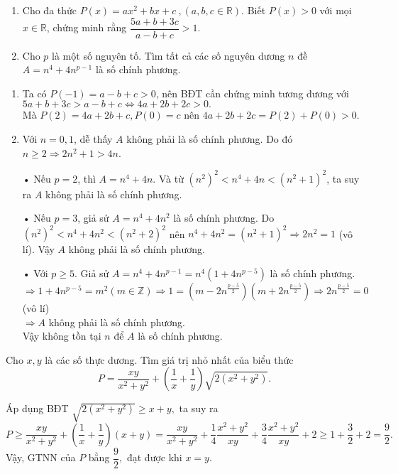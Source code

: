 \begin{ex}%
\hfill
    \begin{enumerate}    
        \item Cho đa thức $P(x)=ax^2+bx+c\ ,(a,b,c \in \mathbb{R})$. Biết $P(x)>0$ với mọi $x \in \mathbb{R}$, chứng minh rằng $\dfrac{5a+b+3c}{a-b+c}>1$.
        \item Cho $p$ là một số nguyên tố. Tìm tất cả các số nguyên dương $n$ đề $A=n^4+4n^{p-1}$ là số chính phương.
    \end{enumerate}
\loigiai
    {
    \begin{enumerate}
    
        \item Ta có $P(-1)=a-b+c>0$, nên BĐT cần chứng minh tương đương với $5a+b+3c>a-b+c \Leftrightarrow 4a+2b+2c>0.$\\
        Mà $P(2)=4a+2b+c, P(0)=c$ nên $4a+2b+2c=P(2)+P(0)>0.$
        \item Với $n=0,1$, dễ thấy $A$ không phải là số chính phương. Do đó $n \ge 2 \Rightarrow 2n^2+1 > 4n$.
        \item[•] Nếu $p=2$, thì $A=n^4+4n$. Và từ $(n^2)^2 < n^4+4n < (n^2+1)^2$, ta suy ra $A$ không phải là số chính phương.
        \item[•] Nếu $p=3$, giả sử $A=n^4+4n^2$ là số chính phương. Do $(n^2)^2 < n^4+4n^2 < (n^2+2)^2$ nên $n^4+4n^2=(n^2+1)^2\Rightarrow 2n^2=1$ (vô lí). Vậy $A$ không phải là số chính phương.
        \item[•] Với $p \geq 5$. Giả sử $A=n^4+4n^{p-1}=n^4(1+4n^{p-5})$ là số chính phương.\\
        $\Rightarrow 1+4n^{p-5}=m^2(m \in \mathbb{Z})\Rightarrow 1=\left( m-2n^{\frac{p-5}{2}} \right) \left(m+2n^{\frac{p-5}{2}}\right)  \Rightarrow 2n^{\frac{p-5}{2}}=0$ (vô lí)\\ $\Rightarrow A$ không phải là số chính phương.\\
        Vậy không tồn tại $n$ để $A$ là số chính phương.
        
        
    \end{enumerate}
    }
\end{ex}

\begin{ex}%
    Cho $x,y$ là các số thực dương. Tìm giá trị nhỏ nhất của biểu thức
$$P=\dfrac{xy}{x^2+y^2}+\left(\dfrac{1}{x}+\dfrac{1}{y}\right)\sqrt{2(x^2+y^2)}.$$
    
\loigiai
    {Áp dụng BĐT $\sqrt{2(x^2+y^2)} \geq x+y,$ ta suy ra
$$P \ge \dfrac{xy}{x^2+y^2}+\left(\dfrac{1}{x}+\dfrac{1}{y}\right)(x+y)=\dfrac{xy}{x^2+y^2}+\dfrac14\dfrac{x^2+y^2}{xy}+\dfrac34\dfrac{x^2+y^2}{xy}+2\geq 1+\dfrac32+2=\dfrac92.$$
Vậy, GTNN của $P$ bằng $\dfrac92,$ đạt được khi $x=y.$
}
\end{ex}

